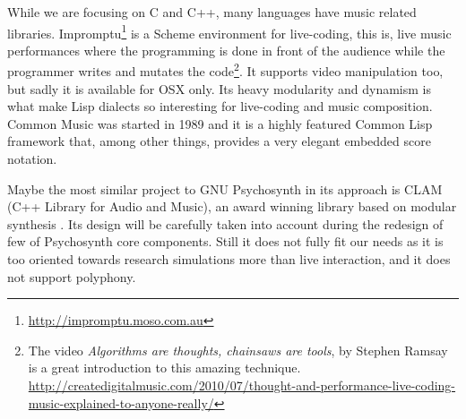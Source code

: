 While we are focusing on C and C++, many languages have music related
libraries. Impromptu\footnote{\url{http://impromptu.moso.com.au}}
 is a Scheme environment for live-coding, this is,
live music performances where the programming is done in front of the
audience while the programmer writes and mutates the code\footnote{The
  video \emph{Algorithms are thoughts, chainsaws are tools}, by
  Stephen Ramsay is a great introduction to this amazing
  technique. \\\url{http://createdigitalmusic.com/2010/07/thought-and-performance-live-coding-music-explained-to-anyone-really/}}. It
supports video manipulation too, but sadly it is available for OSX
only. Its heavy modularity and dynamism is what make Lisp
dialects so interesting for live-coding and music composition. Common
Music \cite{taube97common} was started in 1989 and
it is a highly featured Common Lisp framework that, among other
things, provides a very elegant embedded score notation.

Maybe the most similar project to GNU Psychosynth in its approach is
CLAM (C++ Library for Audio and Music), an award winning
library based on modular synthesis \cite{amatriain2006clam}. Its
design will be carefully taken into account during the redesign of few
of Psychosynth core components. Still it does not fully fit our needs
as it is too oriented towards research simulations more than live
interaction, and it does not support polyphony.


